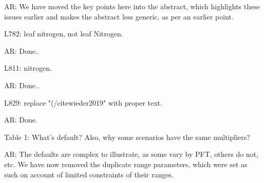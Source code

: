 \documentclass{article}
\begin{document}
\textsf{AR: We have moved the key points here into the abstract, which highlights these issues earlier and makes the abstract less generic, as per an earlier point.}

L782: leaf nitrogen, not leaf Nitrogen. 

\textsf{AR: Done..} 

L811: nitrogen. 

\textsf{AR: Done..} 

L829: replace "(/citewieder2019" with proper text. 

\textsf{AR: Done.} 

Table 1: What's default? Also, why some scenarios have the same multipliers? 

\textsf{AR: The defaults are complex to illustrate, as some vary by PFT, others do not, etc. We have now removed the duplicate range parameters, which were set as such on account of limited constraints of their ranges. }
\end{document}
